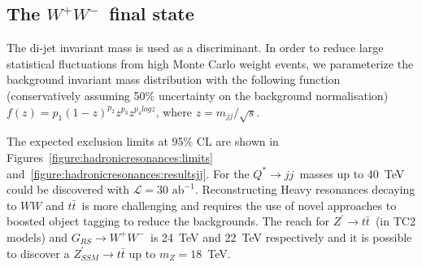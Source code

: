 \documentclass[a4paper,11pt]{article}
\newcommand*{\Zptt}{\ensuremath{Z^{\prime} \rightarrow \ttbar}}
\newcommand*{\intlumifcc}{\ensuremath{\mathcal{L}=30\text{ ab}^{-1}}}
\newcommand*{\qjj}{\ensuremath{Q^{*} \rightarrow jj}}
\newcommand*{\rsg}{\ensuremath{G_{RS} \rightarrow W^+W^-}}
\newcommand*{\ttbar}{\ensuremath{t\bar{t}}}
\newcommand*{\ww}{\ensuremath{W^{+}W^{-}}}
\begin{document}
\subsection{The \ww\ final state}
\label{sec:hadww}

The di-jet invariant mass is used as a discriminant. In order to reduce large statistical fluctuations from high Monte Carlo weight events, we parameterize the background invariant mass distribution with the following function (conservatively assuming 50\% uncertainty on the background normalisation) $f(z)=p_1(1-z)^{p_2}z^{p_3}z^{p_{4}logz}$, where $z=m_{jj}/\sqrt{s}$.

The expected exclusion limits at 95\% CL are shown in Figures~\ref{figure:hadronicresonances:limits} and~\ref{figure:hadronicresonances:resultsjj}. For the \qjj\ masses up to 40~TeV could be discovered with \intlumifcc. Reconstructing Heavy resonances decaying to $WW$ and \ttbar\ is more challenging and requires the use of novel approaches to boosted object tagging to reduce the backgrounds. The reach for \Zptt\ (in TC2 models) and \rsg\ is 24~TeV and 22~TeV respectively and it is possible to discover a $Z^{\prime}_{SSM} \rightarrow \ttbar$ up to $m_{Z}=18$~TeV.
\end{document}
